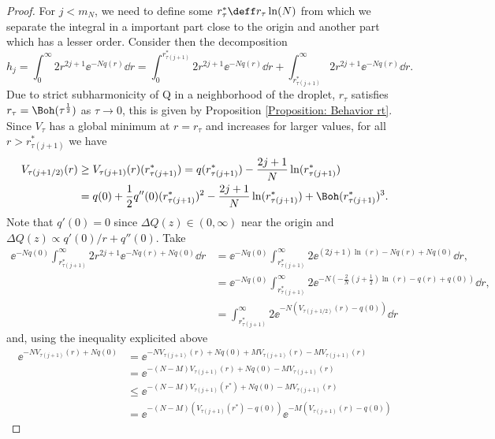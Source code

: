 \begin{proof}
For $j < m_N$, we need to define some $r^*_\tau \deff r_\tau \ln(N)$ from which we separate the integral in a important part close to the origin and another part which has a lesser order. Consider then the decomposition
\begin{equation}
	h_j = \int_{0}^{\infty} 2r^{2j+1} \ee^{-N q(r)} \dd r =\int_{0}^{r^*_{\tau(j+1)}} 2r^{2j+1} \ee^{-N q(r)} \dd r + \int_{r^*_{\tau(j+1)}}^{\infty} 2r^{2j+1} \ee^{-N q(r)} \dd r.
\end{equation}
Due to strict subharmonicity of Q in a neighborhood of the droplet, $r_\tau$ satisfies $r_\tau = \Boh (\tau^{\frac{1}{2}})$ as $\tau \rightarrow 0$, this is given by Proposition \ref{Proposition: Behavior rt}. Since $V_\tau$ has a global minimum at $r = r_\tau$ and increases for larger values, for all $r > r^*_{\tau(j + 1)}$ we have
\begin{align}
	V_{\tau(j+1/2)}(r) & \geq V_{\tau(j+1)}(r)(r^*_{\tau(j+1)}) = q(r^*_{\tau(j+1)}) - \frac{2j + 1}{N} \ln(r^*_{\tau(j+1)}) \\
	& = q(0) + \frac{1}{2} q''(0)(r^*_{\tau(j+1)})^2 - \frac{2j + 1}{N} \ln(r^*_{\tau(j+1)}) + \Boh(r^*_{\tau(j+1)})^3.
\end{align}
Note that $q'(0) = 0$ since $\Delta Q(z) \in (0, \infty)$ near the origin and $\Delta Q(z) \propto q'(0)/r + q''(0)$. Take
\begin{align}
	\ee^{-N q(0)} \int_{r^*_{\tau(j+1)}}^{\infty} 2r^{2j+1} \ee^{-N q(r) + N q(0)} \dd r & =  \ee^{-N q(0)} \int_{r^*_{\tau(j+1)}}^{\infty} 2 \ee^{(2j+1) \ln(r) -N q(r) + N q(0)} \dd r, \\
	& = \ee^{-N q(0)} \int_{r^*_{\tau(j+1)}}^{\infty} 2 \ee^{- N \left(-\frac{2}{N}\left( j + \frac{1}{2} \right) \ln(r) - q(r) + q(0)\right)} \dd r, \\
	& = \int_{r^*_{\tau(j+1)}}^{\infty} 2 \ee^{-N (V_{\tau(j+1/2)}(r) - q(0))} \dd r
\end{align}
and, using the inequality explicited above
\begin{align}
	\ee^{- N V_{\tau(j+1)}(r) + N q(0)} & = \ee^{- N V_{\tau(j+1)}(r) + N q(0) + M V_{\tau(j+1)}(r) - M V_{\tau(j+1)}(r)} \\
	& = \ee^{- (N - M) V_{\tau(j+1)}(r) + N q(0) - M V_{\tau(j+1)}(r)} \\
	& \leq \ee^{- (N - M) V_{\tau(j+1)}(r^*) + N q(0) - M V_{\tau(j+1)}(r)} \\
	& = \ee^{- (N - M) \left(V_{\tau(j+1)}(r^*) - q(0) \right)} \ee^{- M \left(V_{\tau(j+1)}(r) - q(0) \right)}

\end{align}
\end{proof}
